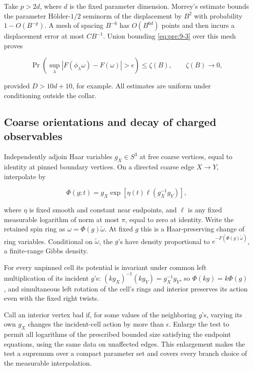 Take \(p>2d\), where \(d\) is the fixed parameter dimension. Morrey's estimate bounds the parameter H\"older-\(1/2\) seminorm of the displacement by \(B^2\) with probability \(1-O(B^{-p})\). A mesh of spacing \(B^{-6}\) has \(O(B^{6d})\) points and then incurs a displacement error at most \(CB^{-1}\). Union bounding \eqref{eq:pre:9-3} over this mesh proves

\begin{equation}
\Pr\left(\sup_\lambda|F(\phi_\lambda\omega)-F(\omega)|>\epsilon\right)
\leq\zeta(B),\qquad \zeta(B)\longrightarrow0,
\label{eq:pre:9-4}
\end{equation}

provided \(D>10d+10\), for example. All estimates are uniform under conditioning outside the collar.


\subsection{Coarse orientations and decay of charged observables}\label{pre:orientations}

Independently adjoin Haar variables \(g_X\in S^3\) at free coarse vertices, equal to identity at pinned boundary vertices. On a directed coarse edge \(X\to Y\), interpolate by

\[
\Phi(g;t)=g_X\exp[\eta(t)\ell(g_X^{-1}g_Y)],
\]

where \(\eta\) is fixed smooth and constant near endpoints, and \(\ell\) is any fixed measurable logarithm of norm at most \(\pi\), equal to zero at identity. Write the retained spin ring as \(\omega=\Phi(g)\widetilde\omega\). At fixed \(g\) this is a Haar-preserving change of ring variables. Conditional on \(\widetilde\omega\), the \(g\)'s have density proportional to \(e^{-F(\Phi(g)\widetilde\omega)}\), a finite-range Gibbs density.

For every unpinned cell its potential is invariant under common left multiplication of its incident \(g\)'s: \((kg_X)^{-1}(kg_Y)=g_X^{-1}g_Y\), so \(\Phi(kg)=k\Phi(g)\), and simultaneous left rotation of the cell's rings and interior preserves its action even with the fixed right twists.

Call an interior vertex bad if, for some values of the neighboring \(g\)'s, varying its own \(g_X\) changes the incident-cell action by more than \(\epsilon\). Enlarge the test to permit all logarithms of the prescribed bounded size satisfying the endpoint equations, using the same data on unaffected edges. This enlargement makes the test a supremum over a compact parameter set and covers every branch choice of the measurable interpolation.

